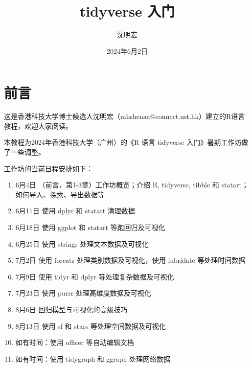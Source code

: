 \documentclass[
  letterpaper,
]{ctexbook}
\title{tidyverse 入门}
\author{沈明宏}
\date{2024年6月2日}
\providecommand{\tightlist}{%
  \setlength{\itemsep}{0pt}\setlength{\parskip}{0pt}}\usepackage{longtable,booktabs,array}
\renewcommand*\contentsname{目录}
\newcommand\contentsname{目录}
\begin{document}
\frontmatter
\maketitle
\ifdefined\Shaded\renewenvironment{Shaded}{\begin{tcolorbox}[boxrule=0pt, interior hidden, breakable, enhanced, frame hidden, borderline west={3pt}{0pt}{shadecolor}, sharp corners]}{\end{tcolorbox}}\fi

\renewcommand*\contentsname{本页目录}
{
\hypersetup{linkcolor=}
\setcounter{tocdepth}{2}
\tableofcontents
}
\mainmatter
{}

\hypertarget{ux524dux8a00}{%
\chapter*{前言}\label{ux524dux8a00}}


这是香港科技大学博士候选人沈明宏（mhshenaa@connect.ust.hk）建立的R语言教程，欢迎大家阅读。

本教程为2024年香港科技大学（广州）的《R 语言 tidyverse
入门》暑期工作坊做了一些调整。

工作坊的当前日程安排如下：

\begin{enumerate}
\def\labelenumi{\arabic{enumi}.}
\tightlist
\item
  6月4日 （前言，第1-3章）工作坊概览；介绍 R, tidyverse, tibble 和
  statart；如何导入、探索、导出数据等
\item
  6月11日 使用 dplyr 和 statart 清理数据
\item
  6月18日 使用 ggplot 和 statart 等跑回归及可视化\\
\item
  6月25日 使用 stringr 处理文本数据及可视化\\
\item
  7月2日 使用 forcats 处理类别数据及可视化，使用 lubridate
  等处理时间数据
\item
  7月9日 使用 tidyr 和 dplyr 等处理复杂数据及可视化
\item
  7月23日 使用 purrr 处理高维度数据及可视化
\item
  8月6日 回归模型与可视化的高级技巧
\item
  8月13日 使用 sf 和 stars 等处理空间数据及可视化
\item
  如有时间：使用 officer 等自动编辑文档
\item
  如有时间：使用 tidygraph 和 ggraph 处理网络数据
\end{enumerate}
\end{document}
